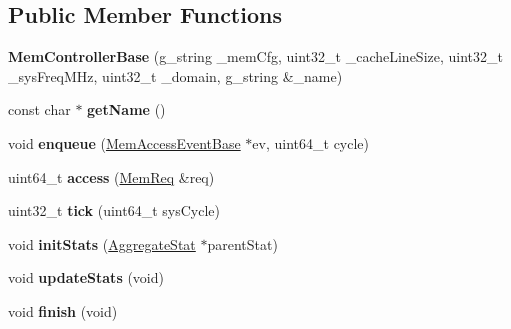 \subsection*{Public Member Functions}
\begin{DoxyCompactItemize}
\item 
\hypertarget{classMemControllerBase_a3cb4e5c7ae504117be8c6ff15502dcc6}{{\bfseries Mem\-Controller\-Base} (g\-\_\-string \-\_\-mem\-Cfg, uint32\-\_\-t \-\_\-cache\-Line\-Size, uint32\-\_\-t \-\_\-sys\-Freq\-M\-Hz, uint32\-\_\-t \-\_\-domain, g\-\_\-string \&\-\_\-name)}\label{classMemControllerBase_a3cb4e5c7ae504117be8c6ff15502dcc6}

\item 
\hypertarget{classMemControllerBase_ac85a1504e9c0652e1612d59badde0032}{const char $\ast$ {\bfseries get\-Name} ()}\label{classMemControllerBase_ac85a1504e9c0652e1612d59badde0032}

\item 
\hypertarget{classMemControllerBase_a4cd70799a3c1edb0af291878f5a9a773}{void {\bfseries enqueue} (\hyperlink{classMemAccessEventBase}{Mem\-Access\-Event\-Base} $\ast$ev, uint64\-\_\-t cycle)}\label{classMemControllerBase_a4cd70799a3c1edb0af291878f5a9a773}

\item 
\hypertarget{classMemControllerBase_a5db8f1b19708c92ae85e3797bf6d6f8b}{uint64\-\_\-t {\bfseries access} (\hyperlink{structMemReq}{Mem\-Req} \&req)}\label{classMemControllerBase_a5db8f1b19708c92ae85e3797bf6d6f8b}

\item 
\hypertarget{classMemControllerBase_ac926fe00ab34f86ed5f2fb398668f978}{uint32\-\_\-t {\bfseries tick} (uint64\-\_\-t sys\-Cycle)}\label{classMemControllerBase_ac926fe00ab34f86ed5f2fb398668f978}

\item 
\hypertarget{classMemControllerBase_a9703e0e4f3b0846c3560f10f6e11492e}{void {\bfseries init\-Stats} (\hyperlink{classAggregateStat}{Aggregate\-Stat} $\ast$parent\-Stat)}\label{classMemControllerBase_a9703e0e4f3b0846c3560f10f6e11492e}

\item 
\hypertarget{classMemControllerBase_ab575ace5f9c765308ab6aa3ca64d5559}{void {\bfseries update\-Stats} (void)}\label{classMemControllerBase_ab575ace5f9c765308ab6aa3ca64d5559}

\item 
\hypertarget{classMemControllerBase_a4c23cd0fbf82abc036fa0050cf752d60}{void {\bfseries finish} (void)}\label{classMemControllerBase_a4c23cd0fbf82abc036fa0050cf752d60}

\end{DoxyCompactItemize}
